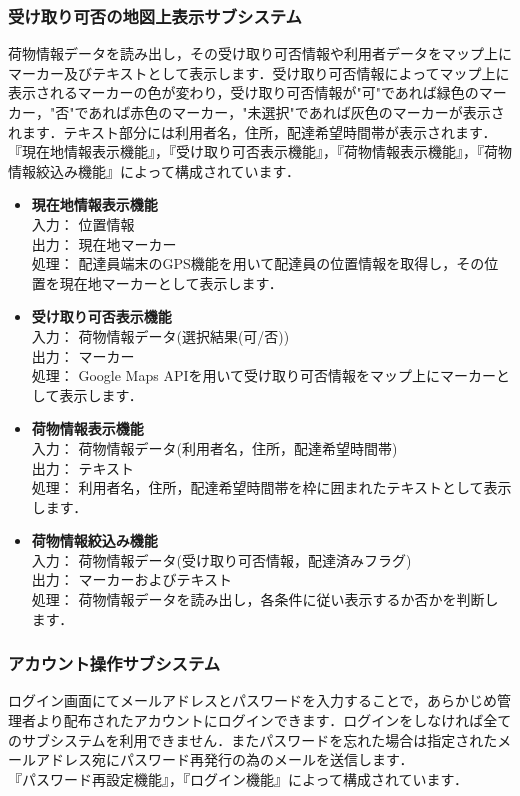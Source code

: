 \documentclass[a4j,titlepage]{jarticle}
\begin{document}
\subsubsection{受け取り可否の地図上表示サブシステム}
荷物情報データを読み出し，その受け取り可否情報や利用者データをマップ上にマーカー及びテキストとして表示します．受け取り可否情報によってマップ上に表示されるマーカーの色が変わり，受け取り可否情報が"可"であれば緑色のマーカー，"否"であれば赤色のマーカー，"未選択"であれば灰色のマーカーが表示されます．テキスト部分には利用者名，住所，配達希望時間帯が表示されます． \\
『現在地情報表示機能』，『受け取り可否表示機能』，『荷物情報表示機能』，『荷物情報絞込み機能』によって構成されています．
\begin{itemize}

\item \textbf{現在地情報表示機能} \\
入力： 位置情報 \\
出力： 現在地マーカー \\
処理： 配達員端末のGPS機能を用いて配達員の位置情報を取得し，その位置を現在地マーカーとして表示します．
\item \textbf{受け取り可否表示機能} \\
入力： 荷物情報データ(選択結果(可/否)) \\
出力： マーカー \\
処理： Google Maps APIを用いて受け取り可否情報をマップ上にマーカーとして表示します．
\item \textbf{荷物情報表示機能} \\
入力： 荷物情報データ(利用者名，住所，配達希望時間帯) \\
出力： テキスト \\
処理： 利用者名，住所，配達希望時間帯を枠に囲まれたテキストとして表示します．
\item \textbf{荷物情報絞込み機能} \\
入力： 荷物情報データ(受け取り可否情報，配達済みフラグ) \\
出力： マーカーおよびテキスト \\
処理： 荷物情報データを読み出し，各条件に従い表示するか否かを判断します．
\end{itemize}

\subsubsection{アカウント操作サブシステム}
ログイン画面にてメールアドレスとパスワードを入力することで，あらかじめ管理者より配布されたアカウントにログインできます．ログインをしなければ全てのサブシステムを利用できません．またパスワードを忘れた場合は指定されたメールアドレス宛にパスワード再発行の為のメールを送信します． \\
『パスワード再設定機能』，『ログイン機能』によって構成されています．
\end{document}
